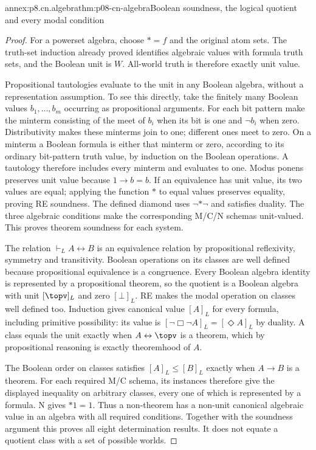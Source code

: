 \begin{annexitem}{annex:p8.cn.algebra}{thm:p08-cn-algebra}{Boolean soundness, the logical quotient and every modal condition}
\begin{proof}
For a powerset algebra, choose \(\ast=f\) and the original
atom sets. The truth-set induction already proved identifies
algebraic values with formula truth sets, and the Boolean unit
is \(W\). All-world truth is therefore exactly unit value.

Propositional tautologies evaluate to the unit in any Boolean
algebra, without a representation assumption. To see this directly,
take the finitely many Boolean values \(b_1,\ldots,b_m\)
occurring as propositional arguments. For each bit pattern make
the minterm consisting of the meet of \(b_i\) when its bit
is one and \(\neg b_i\) when zero. Distributivity makes
these minterms join to one; different ones meet to zero.
On a minterm a Boolean formula is either that minterm or zero,
according to its ordinary bit-pattern truth value, by induction
on the Boolean operations. A tautology therefore includes every
minterm and evaluates to one. Modus ponens preserves unit value
because \(1\to b=b\). If an equivalence has unit value,
its two values are equal; applying the function \(\ast\)
to equal values preserves equality, proving RE soundness. The
defined diamond uses \(\neg\ast\neg\) and satisfies duality.
The three algebraic conditions make the corresponding M/C/N
schemas unit-valued. This proves theorem soundness for each system.

The relation \(\vdash_L A\leftrightarrow B\) is an
equivalence relation by propositional reflexivity, symmetry and
transitivity. Boolean operations on its classes are well defined
because propositional equivalence is a congruence. Every Boolean
algebra identity is represented by a propositional theorem, so
the quotient is a Boolean algebra with unit \([\topv]_L\)
and zero \([\bot]_L\). RE makes the modal operation on
classes well defined too. Induction gives canonical value
\([A]_L\) for every formula, including primitive possibility:
its value is \([\neg\Box\neg A]_L=[\Diamond A]_L\)
by duality. A class equals the unit exactly when
\(A\leftrightarrow\topv\) is a theorem, which by
propositional reasoning is exactly theoremhood of \(A\).

The Boolean order on classes satisfies
\([A]_L\leq[B]_L\) exactly when \(A\to B\) is a
theorem. For each required M/C schema, its instances therefore
give the displayed inequality on arbitrary classes, every one
of which is represented by a formula. N gives \(\ast1=1\).
Thus a non-theorem has a non-unit canonical algebraic value
in an algebra with all required conditions. Together with the
soundness argument this proves all eight determination results.
It does not equate a quotient class with a set of possible worlds.
\end{proof}
\end{annexitem}

